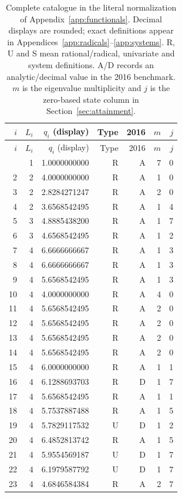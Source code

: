 \begin{longtable}{rrrrrrr}
\caption{Complete catalogue in the literal normalization of Appendix~\ref{app:functionals}. Decimal displays are rounded; exact definitions appear in Appendices~\ref{app:radicals}--\ref{app:systems}. R, U and S mean rational/radical, univariate and system definitions. A/D records an analytic/decimal value in the 2016 benchmark. $m$ is the eigenvalue multiplicity and $j$ is the zero-based state column in Section~\ref{sec:attainment}.}\label{tab:catalogue}\\
\toprule $i$ & $L_i$ & $q_i$ (display) & Type & 2016 & $m$ & $j$\\\midrule\endfirsthead
\toprule $i$ & $L_i$ & $q_i$ (display) & Type & 2016 & $m$ & $j$\\\midrule\endhead
\bottomrule\endfoot
1 & 1 & 1.0000000000 & R & A & 7 & 0\\
2 & 2 & 4.0000000000 & R & A & 1 & 0\\
3 & 2 & 2.8284271247 & R & A & 2 & 0\\
4 & 2 & 3.6568542495 & R & A & 1 & 4\\
5 & 3 & 4.8885438200 & R & A & 1 & 7\\
6 & 3 & 4.6568542495 & R & A & 1 & 2\\
7 & 4 & 6.6666666667 & R & A & 1 & 3\\
8 & 4 & 6.6666666667 & R & A & 1 & 3\\
9 & 4 & 5.6568542495 & R & A & 1 & 3\\
10 & 4 & 4.0000000000 & R & A & 4 & 0\\
11 & 4 & 5.6568542495 & R & A & 2 & 0\\
12 & 4 & 5.6568542495 & R & A & 2 & 0\\
13 & 4 & 5.6568542495 & R & A & 2 & 0\\
14 & 4 & 5.6568542495 & R & A & 2 & 0\\
15 & 4 & 6.0000000000 & R & A & 1 & 1\\
16 & 4 & 6.1288693703 & R & D & 1 & 7\\
17 & 4 & 5.6568542495 & R & A & 1 & 1\\
18 & 4 & 5.7537887488 & R & A & 1 & 5\\
19 & 4 & 5.7829117532 & U & D & 1 & 2\\
20 & 4 & 6.4852813742 & R & A & 1 & 5\\
21 & 4 & 5.9554569187 & U & D & 1 & 7\\
22 & 4 & 6.1979587792 & U & D & 1 & 7\\
23 & 4 & 4.6846584384 & R & A & 2 & 7\\

\end{longtable}
